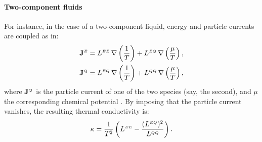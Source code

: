 \paragraph{Two-component fluids}
For instance, in the case of a two-component liquid, energy and particle currents are coupled as in:
\begin{equation}
  \begin{aligned}
    \mathbf{J}^\smallE &= L^{\smallE\smallE}\,  \nabla \left (\frac{1}{T} \right ) + L^{\smallE\smallQ} \, \nabla \left (\frac{\mu}{T} \right ), \\
    \mathbf{J}^{\smallQ} &= L^{\smallE\smallQ} \, \nabla \left (\frac{1}{T} \right ) + L^{\smallQ\smallQ} \, \nabla \left (\frac{\mu}{T} \right ), \label{eq:two-comp-constitutive}
  \end{aligned}
\end{equation}
where $\mathbf{J}^{{\scriptscriptstyle Q}}$ is the particle current of one of the two species (say, the second), and $\mu$ the corresponding chemical potential \cite{Sindzingre1990}. By imposing that the particle current vanishes, the resulting thermal conductivity is:
\begin{equation}
  \kappa=\frac{1}{T^2}
  \left( L^{\smallE\smallE} - \frac{(L^{\smallE\smallQ})^2}{L^{\smallQ\smallQ}} \right). \label{eq:two-comp-kappa}
\end{equation}


\bigskip
\bigskip
{}
